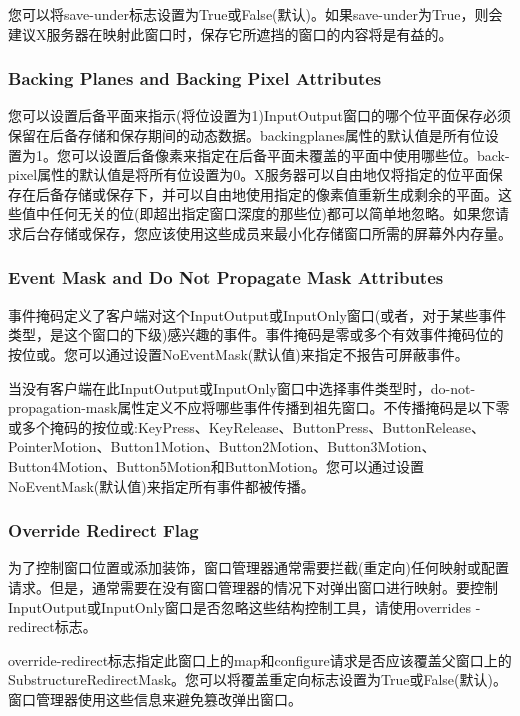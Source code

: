 您可以将save-under标志设置为True或False(默认)。如果save-under为True，则会建议X服务器在映射此窗口时，保存它所遮挡的窗口的内容将是有益的。

\subsubsection{Backing Planes and Backing Pixel Attributes}

您可以设置后备平面来指示(将位设置为1)InputOutput窗口的哪个位平面保存必须保留在后备存储和保存期间的动态数据。backingplanes属性的默认值是所有位设置为1。您可以设置后备像素来指定在后备平面未覆盖的平面中使用哪些位。back-pixel属性的默认值是将所有位设置为0。X服务器可以自由地仅将指定的位平面保存在后备存储或保存下，并可以自由地使用指定的像素值重新生成剩余的平面。这些值中任何无关的位(即超出指定窗口深度的那些位)都可以简单地忽略。如果您请求后台存储或保存，您应该使用这些成员来最小化存储窗口所需的屏幕外内存量。

\subsubsection{Event Mask and Do Not Propagate Mask Attributes}

事件掩码定义了客户端对这个InputOutput或InputOnly窗口(或者，对于某些事件类型，是这个窗口的下级)感兴趣的事件。事件掩码是零或多个有效事件掩码位的按位或。您可以通过设置NoEventMask(默认值)来指定不报告可屏蔽事件。

当没有客户端在此InputOutput或InputOnly窗口中选择事件类型时，do-not-propagation-mask属性定义不应将哪些事件传播到祖先窗口。不传播掩码是以下零或多个掩码的按位或:KeyPress、KeyRelease、ButtonPress、ButtonRelease、PointerMotion、Button1Motion、Button2Motion、Button3Motion、Button4Motion、Button5Motion和ButtonMotion。您可以通过设置NoEventMask(默认值)来指定所有事件都被传播。

\subsubsection{Override Redirect Flag}

为了控制窗口位置或添加装饰，窗口管理器通常需要拦截(重定向)任何映射或配置请求。但是，通常需要在没有窗口管理器的情况下对弹出窗口进行映射。要控制InputOutput或InputOnly窗口是否忽略这些结构控制工具，请使用overrides -redirect标志。

override-redirect标志指定此窗口上的map和configure请求是否应该覆盖父窗口上的SubstructureRedirectMask。您可以将覆盖重定向标志设置为True或False(默认)。窗口管理器使用这些信息来避免篡改弹出窗口。

